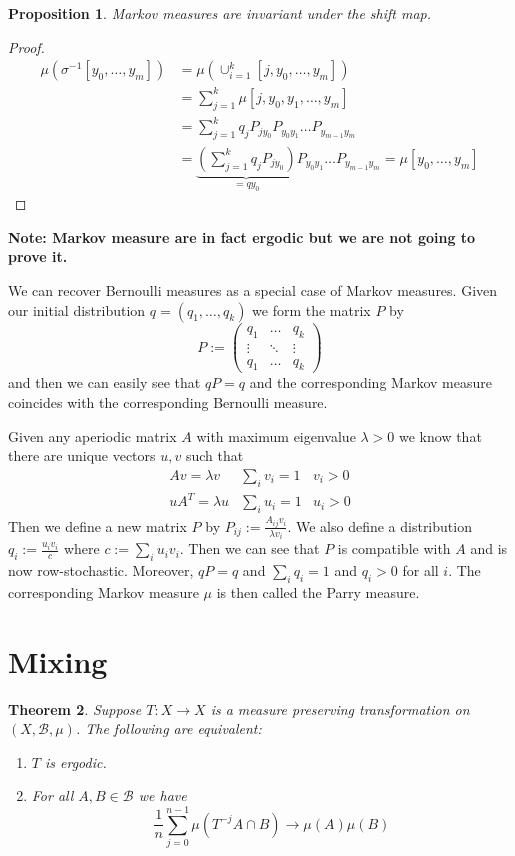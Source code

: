 \documentclass[11pt]{article}
\newcommand{\defeq}{:=}
\newcommand{\mdf}[1]{{\color{red} #1}}
\newenvironment{note}
	{\begin{mdframed}[backgroundcolor=white, linecolor=red, roundcorner=5pt, linewidth=1pt]\bfseries{Note:}\normalfont}
	{\end{mdframed}}
\newtheorem{prop}{Proposition}[section]
\newtheorem{theorem}[prop]{Theorem}
\begin{document}
\begin{prop}
Markov measures are invariant under the shift map.
\end{prop}

\begin{proof}
\begin{align*}
	\mu(\sigma^{-1}[y_0, \dots, y_m]) &= \mu\left( \cup_{i=1}^k [j, y_0, \dots, y_m]\right) \\
									  &= \sum_{j=1}^k\mu[j, y_0, y_1, \dots, y_m] \\
									  &= \sum_{j=1}^k q_jP_{j y_0} P_{y_0 y_1} \dots P_{y_{m-1} y_m} \\
									  &= \underbrace{\left( \sum_{j=1}^k q_j P_{j y_0}\right)}_{=qy_0}P_{y_0 y_1} \dots P_{y_{m-1} y_m}
									  = \mu[y_0, \dots, y_m]
\end{align*}
\end{proof}

\begin{note}
Markov measure are in fact ergodic but we are not going to prove it.
\end{note}

We can recover Bernoulli measures as a special case of Markov measures.
Given our initial distribution $q=(q_1, \dots, q_k)$ we form the matrix $P$ by
\[
P\defeq
\begin{pmatrix}
	q_1 & \dots & q_k \\
	\vdots & \ddots & \vdots \\
	q_1 & \dots & q_k
\end{pmatrix}
\]
and then we can easily see that $qP=q$ and the corresponding Markov measure coincides with the corresponding Bernoulli measure.

Given any aperiodic matrix $A$ with maximum eigenvalue $\lambda>0$ we know that there are unique vectors $u, v$ such that
\begin{align*}
	Av = \lambda v &\sum_{i}v_i=1 & v_i > 0 \\
	uA^T = \lambda u & \sum_{i}u_i =1 & u_i >0
\end{align*}
Then we define a new matrix $P$ by $P_{ij}\defeq\frac{A_{ij} v_i}{\lambda v_i}$.
We also define a distribution $q_i\defeq\frac{u_i v_i}{c}$ where $c\defeq \sum_{i}u_i v_i$.
Then we can see that $P$ is compatible with $A$ and is now row-stochastic.
Moreover, $qP=q$ and $\sum_{i}q_i = 1$ and $q_i>0$ for all $i$.
The corresponding Markov measure $\mu$ is then called the \mdf{Parry measure}.

\section{Mixing}
\begin{theorem}
Suppose $T:X \to X$ is a measure preserving transformation on $(X,\mathcal{B}, \mu)$.
The following are equivalent:
\begin{enumerate}[label=(\alph*)]
	\item $T$ is ergodic.
	\item For all $A,B\in\mathcal{B}$ we have
		\[
			\frac{1}{n}\sum_{j=0}^{n-1}\mu(T^{-j}A\cap B) \to \mu(A)\mu(B)
		\]
\end{enumerate}
\end{theorem}
\end{document}
